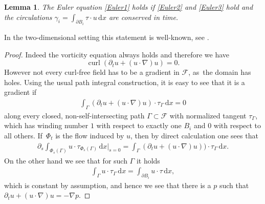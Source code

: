 \documentclass[10pt]{amsart}
\newtheorem{lemma}[theorem]{Lemma}
\theoremstyle{definition}
\DeclareMathOperator{\curl}{curl}
\newcommand\eq{=}
\newcommand\dd{\,\mathrm{d}}
\newcommand\dx{\dd x}
\let\de\partial
\begin{document}
\begin{lemma}\label{rot pre}
The Euler equation \eqref{Euler1} holds if \eqref{Euler2} and \eqref{Euler3} hold and the circulations $\gamma_i=\int_{\de B_i}\tau\cdot u\dx$ are conserved in time.
\end{lemma}
In the two-dimensional setting this statement is well-known, see \eg \cite{filho2007vortex}.

\begin{proof}
Indeed the vorticity equation always holds and therefore we have
\[
\curl(\de_t u+(u\cdot \nabla)u)=0.
\]
However not every curl-free field has to be a gradient in $\mathcal{F}$, as~the domain has holes. Using the usual path integral construction, it is easy to see that it is a gradient if
\begin{align*}
\int_\Gamma (\de_tu+(u\cdot \nabla)u)\cdot \tau_\Gamma\dx\eq0
\end{align*}
along every closed, non-self-intersecting path $\Gamma\subset \mathcal{F}$ with normalized tangent $\tau_\Gamma$, which has winding number $1$ with respect to exactly one $B_i$ and $0$ with respect to all others. If~$\Phi_t$ is the flow induced by $u$, then by direct calculation one sees that
\begin{align*}
\de_s\int_{\Phi_s(\Gamma)}u\cdot\tau_{\Phi_s(\Gamma)}\dx\big|_{s=0}\eq\int_\Gamma (\de_tu+(u\cdot \nabla)u))\cdot \tau_\Gamma\dx.
\end{align*}
On the other hand we see that for such $\Gamma$ it holds
\begin{align*}
\int_\Gamma u\cdot\tau_\Gamma\dx\eq\int_{\de B_i} u\cdot\tau\dx,
\end{align*}
which is constant by assumption, and hence we see that there is a $p$ such that \hbox{$\de_t u+(u\cdot\nabla)u=-\nabla p$}.
\end{proof}
\end{document}
